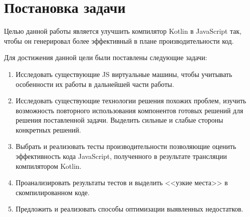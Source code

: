 \chapter{Постановка задачи}

Целью данной работы является улучшить компилятор Kotlin в JavaScript так, чтобы он генерировал более эффективный в плане производительности код.

Для достижения данной цели были поставлены следующие задачи:
\begin{enumerate}
\item Исследовать существующие JS виртуальные машины, чтобы учитывать особенности их работы в дальнейшей части работы.
\item Исследовать существующие технологии решения похожих проблем, изучить возможность повторного использования компонентов готовых решений для решения поставленной задачи. Выделить сильные и слабые стороны конкретных решений.
\item Выбрать и реализовать тесты производительности позволяющие оценить эффективность кода JavaScript,
полученного в результате трансляции компилятором Kotlin.
\item Проанализировать результаты тестов и выделить <<узкие места>> в скомпилированном коде.
\item Предложить и реализовать способы оптимизации выявленных недостатков.
\end{enumerate}